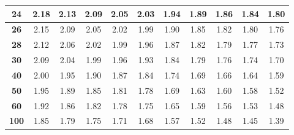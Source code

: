 \begin{tabular}{*{11}{|c}|}
\hline 
\textbf{24} & 2.18 &2.13 &2.09 &2.05 &2.03 &1.94 &1.89 &1.86 &1.84 &1.80 \\
\hline 
\textbf{26} & 2.15 &2.09 &2.05 &2.02 &1.99 &1.90 &1.85 &1.82 &1.80 &1.76 \\
\hline 
\textbf{28} & 2.12 &2.06 &2.02 &1.99 &1.96 &1.87 &1.82 &1.79 &1.77 &1.73 \\
\hline 
\textbf{30} & 2.09 &2.04 &1.99 &1.96 &1.93 &1.84 &1.79 &1.76 &1.74 &1.70 \\
\hline 
\textbf{40} & 2.00 &1.95 &1.90 &1.87 &1.84 &1.74 &1.69 &1.66 &1.64 &1.59 \\
\hline 
\textbf{50} & 1.95 &1.89 &1.85 &1.81 &1.78 &1.69 &1.63 &1.60 &1.58 &1.52 \\
\hline 
\textbf{60} & 1.92 &1.86 &1.82 &1.78 &1.75 &1.65 &1.59 &1.56 &1.53 &1.48 \\
\hline 
\textbf{100} & 1.85 &1.79 &1.75 &1.71 &1.68 &1.57 &1.52 &1.48 &1.45 &1.39 \\
\hline 
\end{tabular}